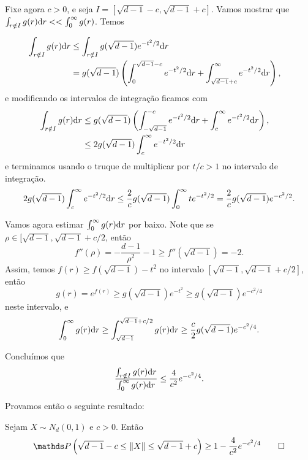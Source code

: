 Fixe agora $c>0$, e seja $I = [\sqrt{d-1} - c, \sqrt{d-1} + c]$. 
Vamos mostrar que~${\int_{r \notin I}g(r)\mathrm d r << \int_0^{\infty}g(r)}$. Temos

\begin{align*}
\int_{r \notin I}g(r) \mathrm d r &\leq 
\int_{r \notin I}g(\sqrt{d-1})e^{-t^2/2} \mathrm d r&\\
& = g(\sqrt{d-1})\left( \int_{0}^{\sqrt{d-1} - c}e^{-t^2/2} \mathrm d r 
+ \int_{\sqrt{d- 1}+c}^{\infty}e^{-t^2/2} \mathrm d r \right),&\\
\end{align*}
e modificando os intervalos de integração ficamos com
\begin{align*}
\int_{r \notin I}g(r) \mathrm d r &
\leq g(\sqrt{d-1})\left( \int_{-\sqrt{d-1}}^{- c}e^{-t^2/2} \mathrm d r 
+ \int_{c}^{\infty}e^{-t^2/2} \mathrm d r \right),&\\
&\leq 2g(\sqrt{d-1})\int_c^{\infty}e^{-t^2/2}\mathrm d r&\\
\end{align*}
e terminamos usando o truque de multiplicar por $t/c > 1$ no 
intervalo de integração.
\begin{equation*}
2g(\sqrt{d-1})\int_c^{\infty}e^{-t^2/2}\mathrm d r \leq 
\frac{2}{c}g(\sqrt{d-1})\int_0^{\infty}te^{-t^2/2}
= \frac{2}{c}g(\sqrt{d-1})e^{-c^2/2}.
\end{equation*}

Vamos agora estimar $\int_0^{\infty}g(r)\mathrm d r$ por baixo. Note que 
se ${\rho \in [\sqrt{d-1}, \sqrt{d-1} + c/2}$, então
$${f''(\rho) = -\frac{d-1}{\rho^2}-1} \geq f''(\sqrt{d-1}) = -2.$$
Assim, temos $f(r)\geq f(\sqrt{d-1}) - t^2$ no intervalo 
${[\sqrt{d-1}, \sqrt{d-1} + c/2]}$, então
\begin{equation*}
g(r) = e^{f(r)} \geq g(\sqrt{d-1})e^{-t^2} \geq g(\sqrt{d-1})e^{-c^2/4}
\end{equation*}
neste intervalo, e
\begin{equation*}
\int_0^{\infty}g(r)\mathrm d r \geq \int_{\sqrt{d-1}}^{\sqrt{d-1} + c/2}
g(r)\mathrm d r \geq \frac{c}{2}g(\sqrt{d-1})e^{-c^2/4}.
\end{equation*}

Concluímos que 
\begin{equation*}
\frac{\int_{r \notin I}g(r) \mathrm d r}{\int_{0}^{\infty}g(r) \mathrm d r}
\leq \frac{4}{c^2}e^{-c^2/4}.
\end{equation*}

Provamos então o seguinte resultado:

\begin{teorema}
Sejam $X\sim N_d(0,1)$ e $c>0$. Então
$$\PP\left(\sqrt{d-1} - c \leq \|X\| \leq \sqrt{d-1} + c\right)\geq 1- \frac{4}{c^2}e^{-c^2/4}\qed$$
\end{teorema}

